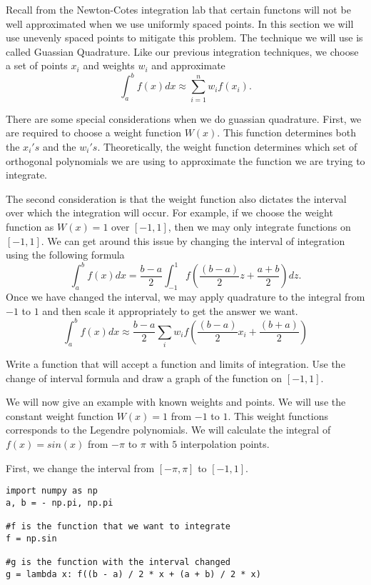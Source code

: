 \label{Lab:GaussQuad}

Recall from the Newton-Cotes integration lab that certain functons will not be well approximated when we use uniformly spaced points.
In this section we will use unevenly spaced points to mitigate this problem.
The technique we will use is called Guassian Quadrature.
Like our previous integration techniques, we choose a set of points $x_i$ and weights $w_i$ and approximate
\[
\int_{a}^b f(x) dx \approx \sum_{i=1}^n w_if(x_i).
\]

There are some special considerations when we do guassian quadrature.
First, we are required to choose a weight function $W(x)$.
This function determines both the $x_i's$ and the $w_i's$.
Theoretically, the weight function determines which set of orthogonal polynomials we are using to approximate the function we are trying to integrate.

The second consideration is that the weight function also dictates the interval over which the integration will occur.
For example, if we choose the weight function as $W(x) = 1$ over $[-1,1]$, then we may only integrate functions on $[-1,1]$.
We can get around this issue by changing the interval of integration using the following formula
\[
\int_a^b f(x) dx = \frac{b-a}{2}\int_{-1}^1 f(\frac{(b-a)}{2}z + \frac{a+b}{2})dz.
\]
Once we have changed the interval, we may apply quadrature to the integral from $-1$ to $1$ and then scale it appropriately to get the answer we want.
\[
\int_a^b f(x) dx \approx \frac{b - a}{2} \sum_i w_if(\frac{(b-a)}{2}x_i + \frac{(b+a)}{2})
\]

\begin{problem}
Write a function that will accept a function and limits of integration.
Use the change of interval formula and draw a graph of the function on $[-1,1]$.
\end{problem}

We will now give an example with known weights and points.
We will use the constant weight function $W(x) = 1$ from $-1$ to $1$.
This weight functions corresponds to the Legendre polynomials.
We will calculate the integral of $f(x) = sin(x)$ from $-\pi$ to $\pi$ with $5$ interpolation points.

First, we change the interval from $[-\pi, \pi]$ to $[-1,1]$.

\begin{lstlisting}
import numpy as np
a, b = - np.pi, np.pi

#f is the function that we want to integrate
f = np.sin

#g is the function with the interval changed
g = lambda x: f((b - a) / 2 * x + (a + b) / 2 * x)
\end{lstlisting}

